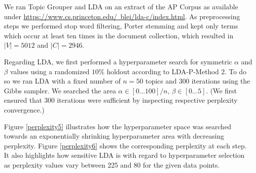 \documentclass[10pt, a4paper, oneside]{article}
\begin{document}
We ran Topic Grouper and LDA on an extract of the AP Corpus as available under \href{https://www.cs.princeton.edu/~blei/lda-c/index.html}{https://www.cs.princeton.edu/~blei/lda-c/index.html}. As preprocessing steps we performed stop word filtering, Porter stemming and kept only terms which occur at least ten times in the document collection, which resulted in $|V| = 5012$ and $|C| = 2946$.

Regarding LDA, we first performed a hyperparameter search for symmetric $\alpha$ and $\beta$ values using a randomized $10\%$ holdout according to
LDA-P-Method 2. To do so we ran LDA with a fixed number of $n = 50$ topics and 300 iterations using the Gibbs sampler. We searched the area $\alpha \in [0 \ldots 100] / n$, $\beta \in [0 \ldots 5]$. (We first ensured that 300 iterations were sufficient by inspecting respective perplexity convergence.)

Figure \ref{perplexity5} illustrates how the hyperparameter space was searched towards an exponentially shrinking hyperparameter area with decreasing perplexity.
Figure \ref{perplexity6} shows the corresponding perplexity at each step. It also highlights how sensitive LDA is with regard to hyperparameter selection as perplexity values vary between 225 and 80 for the given data points.
\end{document}

